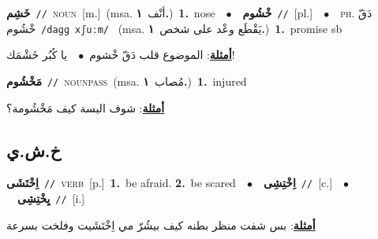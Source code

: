 \documentclass[10pt,a4paper,twoside]{article} %
\begin{document}
\begin{multicols}{2}
{\setlength\topsep{0pt}\textbf{\foreignlanguage{arabic}{خَشِم}}\ {\color{gray}\texttt{//}\color{black}}\ \textsc{noun}\ [m.]\ \color{gray}(msa. \foreignlanguage{arabic}{أنْف}~\foreignlanguage{arabic}{\textbf{١.}})\color{black}\ \textbf{1.}~nose\ \ $\bullet$\ \ \setlength\topsep{0pt}\textbf{\foreignlanguage{arabic}{خْشُوم}}\ {\color{gray}\texttt{//}\color{black}}\ [pl.]\ \ $\bullet$\ \ \textsc{ph.} \color{gray} \foreignlanguage{arabic}{دَقّ خْشُوم}\color{black}\ {\color{gray}\texttt{/{\sffamily daɡɡ xʃuːm}/}\color{black}}\ \color{gray} (msa. \foreignlanguage{arabic}{يَقْطَع وعْد على شخص}~\foreignlanguage{arabic}{\textbf{١.}})\color{black}\ \textbf{1.}~promise sb\  \begin{flushright}\color{gray}\foreignlanguage{arabic}{\textbf{\underline{\foreignlanguage{arabic}{أمثلة}}}: الموضوع قلب دَقّ خْشوم\ $\bullet$\ \  يا كُبُر خَشْمَك!}\end{flushright}\color{black}} \vspace{2mm}

{\setlength\topsep{0pt}\textbf{\foreignlanguage{arabic}{مَخْشُوم}}\ {\color{gray}\texttt{//}\color{black}}\ \textsc{noun\textunderscore pass}\ \color{gray}(msa. \foreignlanguage{arabic}{مُصاب}~\foreignlanguage{arabic}{\textbf{١.}})\color{black}\ \textbf{1.}~injured\  \begin{flushright}\color{gray}\foreignlanguage{arabic}{\textbf{\underline{\foreignlanguage{arabic}{أمثلة}}}: شوف البسة كيف مَخْشُومة؟}\end{flushright}\color{black}} \vspace{2mm}

\vspace{-3mm}
\subsection*{\color{blue}\foreignlanguage{arabic}{خ.ش.ي}\color{blue}{}} 

{\setlength\topsep{0pt}\textbf{\foreignlanguage{arabic}{اِخْتَشَى}}\ {\color{gray}\texttt{//}\color{black}}\ \textsc{verb}\ [p.]\ \textbf{1.}~be afraid.  \textbf{2.}~be scared\ \ $\bullet$\ \ \setlength\topsep{0pt}\textbf{\foreignlanguage{arabic}{اِخْتِشِى}}\ {\color{gray}\texttt{//}\color{black}}\ [c.]\ \ $\bullet$\ \ \setlength\topsep{0pt}\textbf{\foreignlanguage{arabic}{يِخْتِشِى}}\ {\color{gray}\texttt{//}\color{black}}\ [i.]\  \begin{flushright}\color{gray}\foreignlanguage{arabic}{\textbf{\underline{\foreignlanguage{arabic}{أمثلة}}}: بس شفت منظر بطنه كيف بيشُرّ مي اِخْتَشَيت وفلخت بسرعة}\end{flushright}\color{black}} \vspace{2mm}


\end{multicols}
\end{document}
